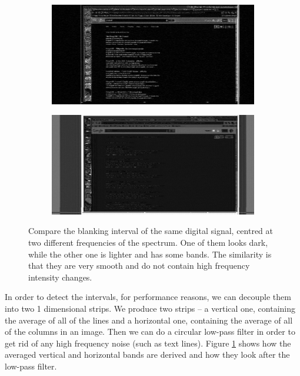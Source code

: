 \documentclass[a4paper,12pt,twoside,openright]{report}
\begin{document}
\begin{figure}[h]
\centering
\begin{subfigure}[b]{0.6\textwidth}
  \includegraphics[width=\textwidth]{sync_black}
\end{subfigure} \vspace{0.5cm}\vfill
\begin{subfigure}[b]{0.6\textwidth}
  \includegraphics[width=\textwidth]{sync_gray}
\end{subfigure}
\caption{Compare the blanking interval of the same digital signal, centred at two different frequencies of the spectrum. One of them looks dark, while the other one is lighter and has some bands. The similarity is that they are very smooth and do not contain high frequency intensity changes.}
\label{fig:syncing}
\end{figure}

In order to detect the intervals, for performance reasons, we can decouple them into two 1 dimensional strips. We produce two strips -- a vertical one, containing the average of all of the lines and a horizontal one, containing the average of all of the columns in an image. Then we can do a circular low-pass filter in order to get rid of any high frequency noise (such as text lines). Figure \ref{fig:syncing} shows how the averaged vertical and horizontal bands are derived and how they look after the low-pass filter.
\end{document}
